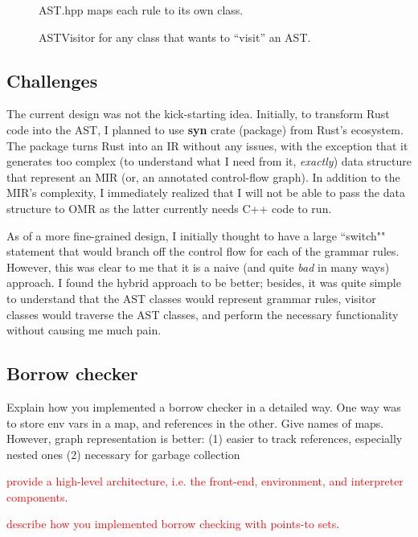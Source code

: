\begin{figure*}[ht]
    \begin{center}
        
    \end{center}
    \caption{AST.hpp maps each rule to its own class.}
    \label{cpp1}
\end{figure*}

\begin{figure*}[ht]
    \begin{center}
        
    \end{center}
    \caption{ASTVisitor for any class that wants to ``visit'' an AST.}
    \label{cpp2}
\end{figure*}

\subsection{Challenges}

The current design was not the kick-starting idea. Initially, to transform Rust
code into the AST, I planned to use \textbf{syn} crate (package) from Rust's
ecosystem.  The package turns Rust into an IR without any issues, with the
exception that it generates too complex (to understand what I need from it,
\textit{exactly}) data structure that represent an MIR (or, an annotated
control-flow graph). In addition to the MIR's complexity, I immediately
realized that I will not be able to pass the data structure
to OMR as the latter currently needs C++ code to run.

As of a more fine-grained design, I initially thought to
have a large ``switch"" statement that would branch off
the control flow for each of the grammar rules. However,
this was clear to me that it is a naive (and quite \textit{bad} in many ways)
approach. I found the hybrid approach to be better; besides,
it was quite simple to understand that the AST classes would
represent grammar rules, visitor classes would traverse the AST
classes, and perform the necessary functionality without causing me much
pain.

\subsection{Borrow checker}

Explain how you implemented a borrow checker in a detailed way.
One way was to store env vars in a map, and references in the other.
Give names of maps.
However, graph representation is better: (1) easier to track references,
especially nested ones (2) necessary for garbage collection

\textcolor{red}{provide a high-level architecture, i.e. the front-end, environment,
and interpreter components}.

\textcolor{red}{describe how you implemented borrow checking with points-to sets}.
